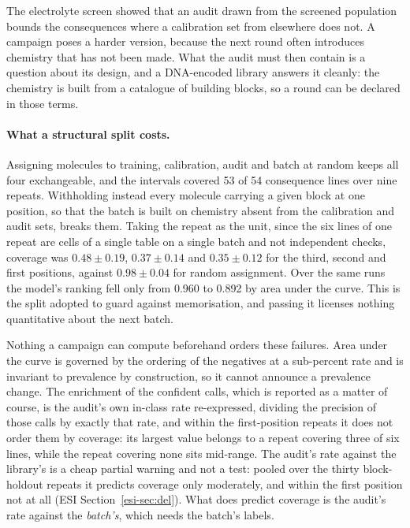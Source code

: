 \documentclass[twocolumn,10pt]{article}
\begin{document}
The electrolyte screen showed that an audit drawn from the screened population bounds the
consequences where a calibration set from elsewhere does not. A campaign poses a harder version,
because the next round often introduces chemistry that has not been made. What the audit must
then contain is a question about its design, and a DNA-encoded library answers it cleanly: the
chemistry is built from a catalogue of building blocks, so a round can be declared in those
terms.

\paragraph{What a structural split costs.} Assigning molecules to training, calibration, audit
and batch at random keeps all four exchangeable, and the intervals covered 53 of 54 consequence
lines over nine repeats. Withholding instead every molecule carrying a given block at one
position, so that the batch is built on chemistry absent from the calibration and audit sets,
breaks them. Taking the repeat as the unit, since the six lines of one repeat are cells of a single table on a single batch and not independent checks, coverage was $0.48\pm0.19$, $0.37\pm0.14$ and
$0.35\pm0.12$ for the third, second and first positions, against $0.98\pm0.04$ for random
assignment. Over the same runs the model's ranking fell only from 0.960 to 0.892 by area under
the curve. This is the split adopted to guard against memorisation, and passing it
licenses nothing quantitative about the next batch.

Nothing a campaign can compute beforehand orders these failures. Area under the curve is
governed by the ordering of the negatives at a sub-percent rate and is invariant to prevalence by
construction, so it cannot announce a prevalence change. The enrichment of the confident calls,
which is reported as a matter of course, is the audit's own in-class rate re-expressed, dividing the precision of those calls by exactly that rate, and within the
first-position repeats it does not order them by coverage: its largest value belongs to a repeat
covering three of six lines, while the repeat covering none sits mid-range. The audit's rate
against the library's is a cheap partial warning and not a test: pooled over the thirty
block-holdout repeats it predicts coverage only moderately, and within the first position not at
all (ESI Section~\ref{esi-sec:del}). What does predict coverage is the audit's rate against the
\emph{batch's}, which needs the batch's labels.
\end{document}
